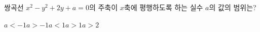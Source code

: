 쌍곡선 $x^2-y^2+2y+a=0$의 주축이 $x$축에 평행하도록 하는 실수 $a$의 값의 범위는?
\begin{choices32}{$a<-1$}{$a>-1$}{$a<1$}{$a>1$}{$a>2$}\end{choices32}
